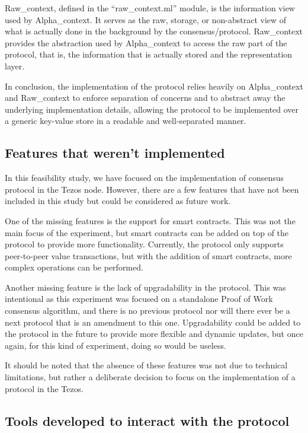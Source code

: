 Raw\_context, defined in the ``raw\_context.ml'' module, is the information view used by Alpha\_context. It serves as the raw, storage, or non-abstract view of what is actually done in the background by the consensus/protocol. Raw\_context provides the abstraction used by Alpha\_context to access the raw part of the protocol, that is, the information that is actually stored and the representation layer.

In conclusion, the implementation of the protocol relies heavily on Alpha\_context and Raw\_context to enforce separation of concerns and to abstract away the underlying implementation details, allowing the protocol to be implemented over a generic key-value store in a readable and well-separated manner.

\subsection*{Features that weren't implemented}
In this feasibility study, we have focused on the implementation of consensus protocol in the Tezos node. However, there are a few features that have not been included in this study but could be considered as future work.

One of the missing features is the support for smart contracts. This was not the main focus of the experiment, but smart contracts can be added on top of the protocol to provide more functionality. Currently, the protocol only supports peer-to-peer value transactions, but with the addition of smart contracts, more complex operations can be performed.

Another missing feature is the lack of upgradability in the protocol. This was intentional as this experiment was focused on a standalone Proof of Work consensus algorithm, and there is no previous protocol nor will there ever be a next protocol that is an amendment to this one. Upgradability could be added to the protocol in the future to provide more flexible and dynamic updates, but once again, for this kind of experiment, doing so would be useless.

It should be noted that the absence of these features was not due to technical limitations, but rather a deliberate decision to focus on the implementation of a protocol in the Tezos.

\subsection*{Tools developed to interact with the protocol}


